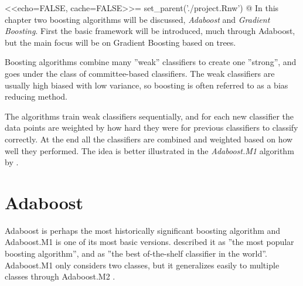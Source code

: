 <<echo=FALSE, cache=FALSE>>=
set_parent('./project.Rnw')
@
In this chapter two boosting algorithms will be discussed, \textit{Adaboost} and \textit{Gradient Boosting}. First the basic framework will be introduced, much through Adaboost, but the main focus will be on Gradient Boosting based on trees. 

Boosting algorithms combine many ''weak'' classifiers to create one ''strong'', and goes under the class of committee-based classifiers. The weak classifiers are usually high biased with low variance, so boosting is often referred to as a bias reducing method. 

The algorithms train weak classifiers sequentially, and for each new classifier the data points are weighted by how hard they were for previous classifiers to classify correctly. At the end all the classifiers are combined and weighted based on how well they performed. The idea is better illustrated in the \textit{Adaboost.M1} algorithm by  \cite{adaboostM1}.
\section{Adaboost}
\label{sec:Adaboost}
Adaboost is perhaps the most historically significant boosting algorithm and Adaboost.M1 is one of its most basic versions. \cite{modstat} described it as ''the most popular boosting algorithm'', and \cite{Breiman1996} as ''the best of-the-shelf classifier in the world''. Adaboost.M1 only considers two classes, but it generalizes easily to multiple classes through Adaboost.M2 \citep{adaboostM1}. 

